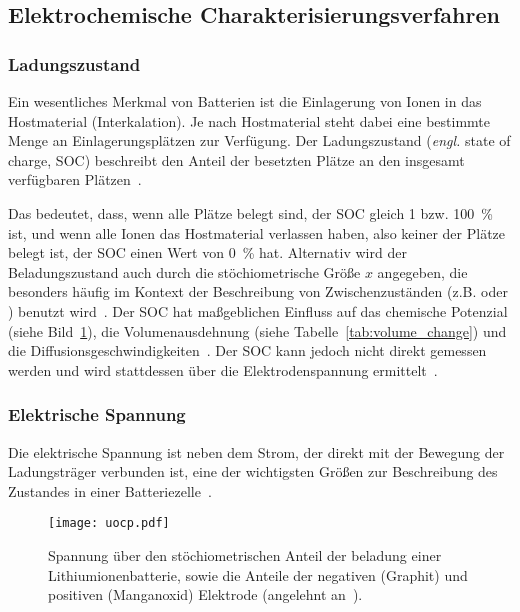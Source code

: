 \subsection{Elektrochemische Charakterisierungsverfahren}

\subsubsection*{Ladungszustand}
Ein wesentliches Merkmal von Batterien ist die Einlagerung von Ionen in das Hostmaterial (Interkalation). Je nach Hostmaterial steht dabei eine bestimmte Menge an Einlagerungsplätzen zur Verfügung. Der Ladungszustand (\textit{engl.} state of charge, SOC) beschreibt den Anteil der besetzten Plätze an den insgesamt verfügbaren Plätzen~\cite{Plett2015}.

Das bedeutet, dass, wenn alle Plätze belegt sind, der SOC gleich 1 bzw. 100~\% ist, und wenn alle Ionen das Hostmaterial verlassen haben, also keiner der Plätze belegt ist, der SOC einen Wert von 0~\% hat. Alternativ wird der Beladungszustand auch durch die stöchiometrische Größe $x$ angegeben, die besonders häufig im Kontext der Beschreibung von Zwischenzuständen (z.B.  oder ) benutzt wird~\cite{Newman2021}. Der SOC hat maßgeblichen Einfluss auf das chemische Potenzial (siehe Bild~\ref{fig:battery_voltage}), die Volumenausdehnung (siehe Tabelle~\ref{tab:volume_change}) und die Diffusionsgeschwindigkeiten~\cite{Plett2024}. Der SOC kann jedoch nicht direkt gemessen werden und wird stattdessen über die Elektrodenspannung ermittelt~\cite{Newman2021}.



\subsubsection*{Elektrische Spannung}

Die elektrische Spannung ist neben dem Strom, der direkt mit der Bewegung der Ladungsträger verbunden ist, eine der wichtigsten Größen zur Beschreibung des Zustandes in einer Batteriezelle~\cite{Beard2019}. 

\begin{figure}[ht]
    \center
		\texttt{[image: uocp.pdf]}
		\caption{\label{fig:battery_voltage}Spannung über den stöchiometrischen Anteil der beladung einer Lithiumionenbatterie, sowie die Anteile der negativen (Graphit) und positiven (Manganoxid) Elektrode (angelehnt an~\cite{Newman2021}).}
\end{figure}

